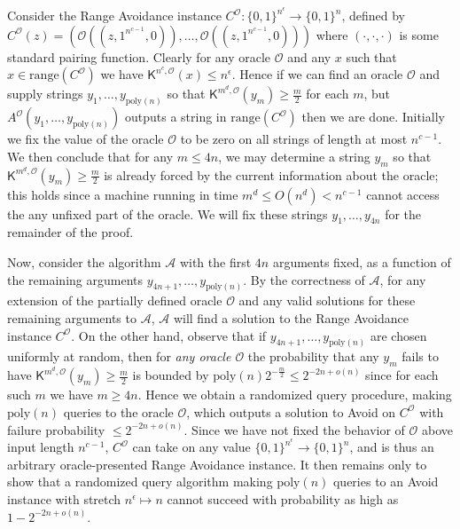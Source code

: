 \documentclass[10pt,a4paper]{article}
\begin{document}
Consider the Range Avoidance instance $C^{\mathcal{O}}:\{0,1\}^{n^{\epsilon}}\to\{0,1\}^{n}$, defined by $C^{\mathcal{O}}(z)=(\mathcal{O}((z,1^{n^{c-1}},0)),\ldots,\mathcal{O}((z,1^{n^{c-1}},0)))$ where $(\cdot,\cdot,\cdot)$ is some standard pairing function. Clearly for any oracle $\mathcal{O}$ and any $x$ such that $x\in\mathrm{range}(C^{\mathcal{O}})$ we have ${\mathsf{K}}^{n^{c},\mathcal{O}}(x)\leq n^{\epsilon}$. Hence if we can find an oracle $\mathcal{O}$ and supply strings $y_{1},\ldots,y_{\mathrm{poly}(n)}$ so that ${\mathsf{K}}^{m^{d},\mathcal{O}}(y_{m})\geq\frac{m}{2}$ for each $m$, but $A^{\mathcal{O}}(y_{1},\ldots,y_{\mathrm{poly}(n)})$ outputs a string in $\mathrm{range}(C^{\mathcal{O}})$ then we are done. Initially we fix the value of the oracle $\mathcal{O}$ to be zero on all strings of length at most $n^{c-1}$. We then conclude that for any $m\leq 4n$, we may determine a string $y_{m}$ so that ${\mathsf{K}}^{m^{d},\mathcal{O}}(y_{m})\geq\frac{m}{2}$ is already forced by the current information about the oracle; this holds since a machine running in time $m^{d}\leq O(n^{d})<n^{c-1}$ cannot access the any unfixed part of the oracle. We will fix these strings $y_{1},\ldots,y_{4n}$ for the remainder of the proof.\par




Now, consider the algorithm $\mathcal{A}$ with the first $4n$ arguments fixed, as a function of the remaining arguments $y_{4n+1},\ldots,y_{\mathrm{poly}(n)}$. By the correctness of $\mathcal{A}$, for any extension of the partially defined oracle $\mathcal{O}$ and any valid solutions for these remaining arguments to $\mathcal{A}$, $\mathcal{A}$ will find a solution to the Range Avoidance instance $C^{\mathcal{O}}$. On the other hand, observe that if $y_{4n+1},\ldots,y_{\mathrm{poly}(n)}$ are chosen uniformly at random, then for \emph{any oracle $\mathcal{O}$} the probability that any $y_{m}$ fails to have ${\mathsf{K}}^{m^{d},\mathcal{O}}(y_{m})\geq\frac{m}{2}$ is bounded by $\mathrm{poly}(n)2^{-\frac{m}{2}}\leq 2^{-2n+o(n)}$ since for each such $m$ we have $m\geq 4n$. Hence we obtain a randomized query procedure, making $\mathrm{poly}(n)$ queries to the oracle $\mathcal{O}$, which outputs a solution to Avoid on $C^{\mathcal{O}}$ with failure probability $\leq 2^{-2n+o(n)}$. Since we have not fixed the behavior of $\mathcal{O}$ above input length $n^{c-1}$, $C^{\mathcal{O}}$ can take on any value $\{0,1\}^{n^{\epsilon}}\to\{0,1\}^{n}$, and is thus an arbitrary oracle-presented Range Avoidance instance. It then remains only to show that a randomized query algorithm making $\mathrm{poly}(n)$ queries to an Avoid instance with stretch $n^{\epsilon}\mapsto n$ cannot succeed with probability as high as $1-2^{-2n+o(n)}$.\par
\end{document}
